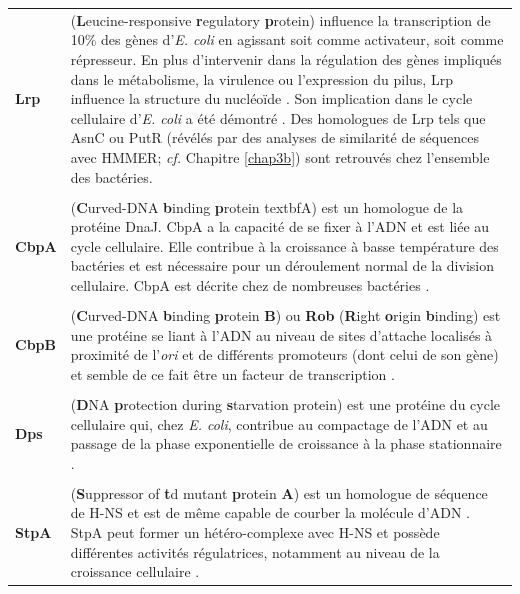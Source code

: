 \begin{longtable}{@{\hspace{-2cm}\hspace{1cm}} >{\bfseries}p{} | >{\small}p{\textwidth}}
	\\[-0.2cm]
	Lrp & (\textbf{L}eucine-responsive \textbf{r}egulatory \textbf{p}rotein) influence la transcription de 10\% des gènes d'\textit{E. coli} en agissant soit comme activateur, soit comme répresseur. En plus d'intervenir dans la régulation des gènes impliqués dans le métabolisme, la virulence ou l'expression du pilus, Lrp influence la structure du nucléoïde \citep{Browning2010}. Son implication dans le cycle cellulaire d'\textit{E. coli} a été démontré \citep{corcoran2009dna}. Des homologues de Lrp tels que AsnC ou PutR (révélés par des analyses de similarité de séquences avec HMMER; \textit{cf.} Chapitre \ref{chap3b}) sont retrouvés chez l'ensemble des bactéries.\\
	\\[-0.2cm]
	CbpA & (\textbf{C}urved-DNA \textbf{b}inding \textbf{p}rotein textbf{A}) est un homologue de la protéine DnaJ. CbpA a la capacité de se fixer à l'ADN et est liée au  cycle cellulaire. Elle contribue à la croissance à basse température des bactéries et est nécessaire pour un déroulement normal de la division cellulaire. CbpA est décrite chez de nombreuses bactéries \citep{Dillon2010}.\\
	\\[-0.2cm]
	CbpB & (\textbf{C}urved-DNA \textbf{b}inding \textbf{p}rotein \textbf{B}) ou \textbf{Rob} (\textbf{R}ight \textbf{o}rigin \textbf{b}inding) est une protéine se liant à l'ADN au niveau de sites d'attache localisés à proximité de l'\textit{ori} et de différents promoteurs (dont celui de son gène) et semble de ce fait être un facteur de transcription \citep{azam1999twelve}.\\ 
	\\[-0.2cm]
	Dps & (\textbf{D}NA \textbf{p}rotection during \textbf{s}tarvation protein) est une protéine du cycle cellulaire qui, chez \textit{E. coli}, contribue au compactage de l'ADN et au passage de la phase exponentielle de croissance à la phase stationnaire \citep{azam1999twelve}.\\
	\\[-0.2cm]
	StpA & (\textbf{S}uppressor of \textbf{t}d mutant \textbf{p}rotein \textbf{A}) est un homologue de séquence de H-NS et est de même capable de courber la molécule d'ADN \citep{azam1999twelve}. StpA peut former un hétéro-complexe avec H-NS et possède différentes activités régulatrices, notamment au niveau de la croissance cellulaire \citep{Dillon2010}.\\
\end{longtable}

